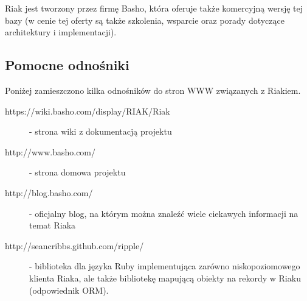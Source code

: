 Riak jest tworzony przez firmę Basho, która oferuje także komercyjną wersję tej bazy (w cenie tej oferty są także szkolenia, wsparcie oraz porady dotyczące architektury i implementacji).

\subsection*{Pomocne odnośniki}
 
Poniżej zamieszczono kilka odnośników do stron WWW związanych z Riakiem.

\begin{description}
 \item [https://wiki.basho.com/display/RIAK/Riak] - strona wiki z dokumentacją projektu
 \item [http://www.basho.com/] - strona domowa projektu
 \item [http://blog.basho.com/] - oficjalny blog, na którym można znaleźć wiele ciekawych informacji na temat Riaka
 \item [http://seancribbs.github.com/ripple/] - biblioteka dla języka Ruby implementująca zarówno niskopoziomowego klienta Riaka, ale także bibliotekę mapującą obiekty na rekordy w Riaku (odpowiednik ORM).
\end{description}
